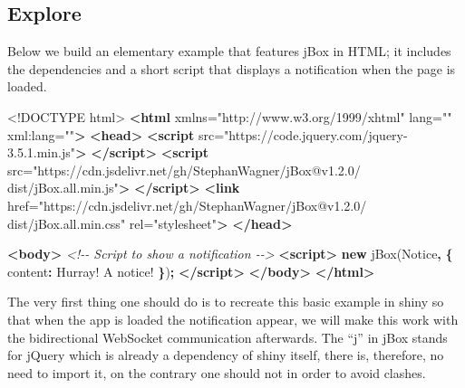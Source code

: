 \documentclass[
  10pt,
]{krantz}
\makeatletter
\newenvironment{Shaded}{\begin{snugshade}}{\end{snugshade}}
\newcommand{\AttributeTok}[1]{\textcolor[rgb]{0.61,0.61,0.61}{#1}}
\newcommand{\CommentTok}[1]{\textcolor[rgb]{0.37,0.37,0.37}{\textit{#1}}}
\newcommand{\DataTypeTok}[1]{\textcolor[rgb]{0.27,0.27,0.27}{#1}}
\newcommand{\KeywordTok}[1]{\textcolor[rgb]{0.27,0.27,0.27}{\textbf{#1}}}
\newcommand{\NormalTok}[1]{#1}
\newcommand{\OperatorTok}[1]{\textcolor[rgb]{0.43,0.43,0.43}{\textbf{#1}}}
\newcommand{\OtherTok}[1]{\textcolor[rgb]{0.37,0.37,0.37}{#1}}
\newcommand{\StringTok}[1]{\textcolor[rgb]{0.5,0.5,0.5}{#1}}
\newenvironment{kframe}{%
\medskip{}
\setlength{\fboxsep}{.8em}
 \def\at@end@of@kframe{}%
 \ifinner\ifhmode%
  \def\at@end@of@kframe{\end{minipage}}%
  \begin{minipage}{\columnwidth}%
 \fi\fi%
 \def\FrameCommand##1{\hskip\@totalleftmargin \hskip-\fboxsep
 \colorbox{shadecolor}{##1}\hskip-\fboxsep
     \hskip-\linewidth \hskip-\@totalleftmargin \hskip\columnwidth}%
 \MakeFramed {\advance\hsize-\width
   \@totalleftmargin\z@ \linewidth\hsize
   \@setminipage}}%
 {\par\unskip\endMakeFramed%
 \at@end@of@kframe}
\renewenvironment{Shaded}{\begin{kframe}}{\end{kframe}}
\makeatother
\begin{document}
\hypertarget{shiny-intro-explore}{%
\subsection{Explore}\label{shiny-intro-explore}}

Below we build an elementary example that features jBox in HTML; it includes the dependencies and a short script that displays a notification when the page is loaded.

\begin{Shaded}
\begin{Highlighting}[]
\DataTypeTok{<!DOCTYPE }\NormalTok{html}\DataTypeTok{>}
\KeywordTok{<html}\OtherTok{ xmlns=}\StringTok{"http://www.w3.org/1999/xhtml"}\OtherTok{ lang=}\StringTok{""}\OtherTok{ xml:lang=}\StringTok{""}\KeywordTok{>}
\KeywordTok{<head>}
\KeywordTok{<script} 
\OtherTok{  src=}\StringTok{"https://code.jquery.com/jquery{-}3.5.1.min.js"}\KeywordTok{>}
  \KeywordTok{</script>}
\KeywordTok{<script} 
\OtherTok{  src=}\StringTok{"https://cdn.jsdelivr.net/gh/StephanWagner/jBox@v1.2.0/}
\StringTok{    dist/jBox.all.min.js"}\KeywordTok{>}
\KeywordTok{</script>}
\KeywordTok{<link} 
\OtherTok{  href=}\StringTok{"https://cdn.jsdelivr.net/gh/StephanWagner/jBox@v1.2.0/}
\StringTok{    dist/jBox.all.min.css"} 
\OtherTok{  rel=}\StringTok{"stylesheet"}\KeywordTok{>}
\KeywordTok{</head>}

\KeywordTok{<body>}
  \CommentTok{<!{-}{-} Script to show a notification {-}{-}>}
  \KeywordTok{<script>}
    \KeywordTok{new} \AttributeTok{jBox}\NormalTok{(}\StringTok{\textquotesingle{}Notice\textquotesingle{}}\OperatorTok{,} \OperatorTok{\{}
      \DataTypeTok{content}\OperatorTok{:} \StringTok{\textquotesingle{}Hurray! A notice!\textquotesingle{}}
    \OperatorTok{\}}\NormalTok{)}\OperatorTok{;}
  \KeywordTok{</script>}
\KeywordTok{</body>}
\KeywordTok{</html>}
\end{Highlighting}
\end{Shaded}

The very first thing one should do is to recreate this basic example in shiny so that when the app is loaded the notification appear, we will make this work with the bidirectional WebSocket communication afterwards. The ``j'' in jBox stands for jQuery which is already a dependency of shiny itself, there is, therefore, no need to import it, on the contrary one should not in order to avoid clashes.
\end{document}
